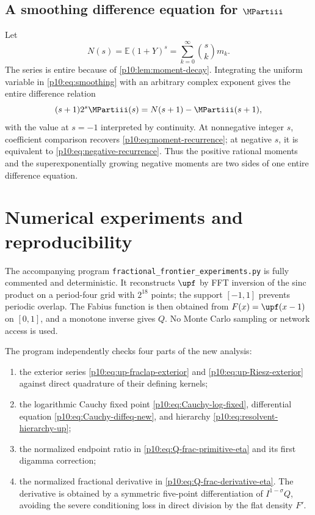 \documentclass[11pt,oneside]{article}
\theoremstyle{definition}
\theoremstyle{remark}
\newcommand{\F}{F}
\newcommand{\Q}{Q}
\newcommand{\E}{\mathbb E}
\newcommand{\1}{\mathbf 1}
\begin{document}
\subsection{A smoothing difference equation for \texorpdfstring{\(\MPartiii\)}{M}}

Let
\begin{equation}\label{p10:eq:Ndef}
 N(s)=\E(1+Y)^s
 =\sum_{k=0}^{\infty}\binom skm_k.
\end{equation}
The series is entire because of \cref{p10:lem:moment-decay}.  Integrating the uniform
variable in \cref{p10:eq:smoothing} with an arbitrary complex exponent gives the entire
difference relation
\begin{equation}\label{p10:eq:M-difference}
 (s+1)2^s\MPartiii(s)=N(s+1)-\MPartiii(s+1),
\end{equation}
with the value at \(s=-1\) interpreted by continuity.  At nonnegative integer \(s\),
coefficient comparison recovers \cref{p10:eq:moment-recurrence}; at negative \(s\), it is
equivalent to \cref{p10:eq:negative-recurrence}.  Thus the positive rational moments and
the superexponentially growing negative moments are two sides of one entire
difference equation.

\section{Numerical experiments and reproducibility}
\label{p10:sec:numerics-new}\label{p10:sec:numerics}

The accompanying program \texttt{fractional\_frontier\_experiments.py} is fully
commented and deterministic.  It reconstructs \(\upf\) by FFT inversion of the sinc
product on a period-four grid with \(2^{18}\) points; the support \([-1,1]\) prevents
periodic overlap.  The Fabius function is then obtained from
\(\F(x)=\upf(x-1)\) on \([0,1]\), and a monotone inverse gives \(\Q\).
No Monte Carlo sampling or network access is used.

The program independently checks four parts of the new analysis:
\begin{enumerate}
\item the exterior series \eqref{p10:eq:up-fraclap-exterior} and
\eqref{p10:eq:up-Riesz-exterior} against direct quadrature of their defining kernels;
\item the logarithmic Cauchy fixed point \eqref{p10:eq:Cauchy-log-fixed}, differential
equation \eqref{p10:eq:Cauchy-diffeq-new}, and hierarchy
\eqref{p10:eq:resolvent-hierarchy-up};
\item the normalized endpoint ratio in
\eqref{p10:eq:Q-frac-primitive-eta} and its first digamma correction;
\item the normalized fractional derivative in
\eqref{p10:eq:Q-frac-derivative-eta}.  The derivative is obtained by a symmetric
five-point differentiation of \(I^{1-\sigma}\Q\), avoiding the severe conditioning
loss in direct division by the flat density \(\F'\).
\end{enumerate}
\end{document}
